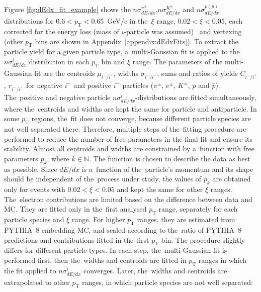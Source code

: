 \noindent Figure \ref{fig:dEdx_fit_example}
shows the $n\sigma^{\pi^\pm}_{dE/dx}$,$n\sigma^{K^\pm}_{dE/dx}$ and $n\sigma^{p(\bar{p})}_{dE/dx}$ distributions for  $0.6 < p_\textrm{T} < 0.65$~GeV/c  in the~$\xi$ range, $0.02 < \xi < 0.05$, each corrected for the energy loss (mass of $i$-particle was assumed)~\cite{supplementaryNote} and vertexing  (other $p_\textrm{T}$ bins are shown in Appendix~\ref{appendix:dEdxFits}). To extract the  particle yield for a given particle type,
a~multi-Gaussian fit is applied to the $n\sigma^i_{dE/dx}$ distribution in each $p_\textrm{T}$ bin and $\xi$ range. The parameters of the multi-Gaussian fit are the centroids $\mu_{i^-/i^+}$, widths $\sigma_{i^-/i^+}$, sums  and ratios  of yields $C_{i^-/i^+}$, $r_{i^-/i^+}$ for negative $i^-$ and positive $i^+$ particles ($\pi^\pm$, $e^\pm$, $K^\pm$, $p$ and $\bar{p}$). The~positive and negative particle
$n\sigma^{i}_{dE/dx}$-distributions are fitted simultaneously, where the~centroids and widths are kept the same for particle
and antiparticle. 
In some $p_\textrm{T}$ regions, the~fit does not converge,
because different particle species are not well separated  there. Therefore, multiple steps of the~fitting procedure  are performed to reduce the number of free parameters in the final fit and ensure its stability. Almost all centroids and widths are constrained  by a~function with free parameters $p_k$, where $k \in \mathbb N$.  The function is chosen to describe the data as best as possible.
Since $dE/dx$ is a~function of the~particle's momentum and its shape should be independent of the~process under study, the values of $p_k$  are obtained only for events with $0.02 < \xi < 0.05$ and kept the same for other $\xi$ ranges. 
The~electron contributions are limited based on the difference between data and MC. They are fitted only in the~first analysed $p_\textrm{T}$ range, separately for each particle species and $\xi$ range. For higher $p_\text{T}$ ranges, they are estimated from PYTHIA~8 embedding MC, and scaled according to the~ratio of PYTHIA~8 predictions and  contributions fitted in the~first $p_\textrm{T}$ bin.
The procedure slightly differs for different particle types. In each step, the~multi-Gaussian fit is performed first, then the~widths and centroids are fitted  in  $p_\textrm{T}$ ranges in which the fit applied to $n\sigma^{i}_{dE/dx}$ converges. Later,  the~widths and centroids are extrapolated to other $p_\textrm{T}$ ranges, in which particle species are not well separated:
